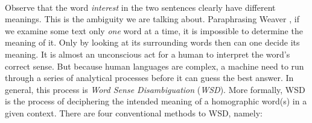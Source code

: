 \documentclass[12 pt]{article}
\begin{document}
\paragraph{}
Observe that the word \textit{interest} in the two sentences clearly have different meanings. This is the ambiguity we are talking about. Paraphrasing Weaver \cite{weaver}, if we examine some text only \textit{one} word at a time, it is impossible to determine the meaning of it. Only by looking at its surrounding words then can one decide its meaning. It is almost an unconscious act for a human to interpret the word's correct sense. But because human languages are complex, a machine need to run through a series of analytical processes before it can guess the best answer. In general, this process is \textit{Word Sense Disambiguation} (\textit{WSD}). More formally, WSD is the process of deciphering the intended meaning of a homographic word(s) in a given context.
There are four conventional methods to WSD, namely:
\end{document}
